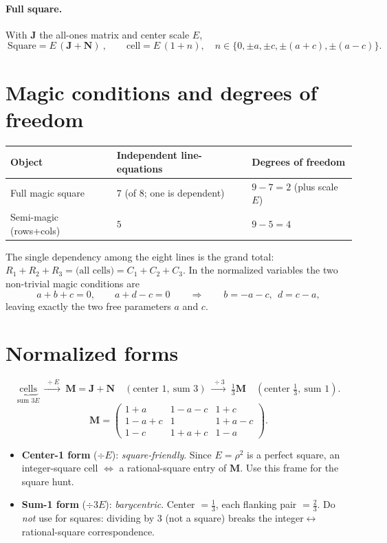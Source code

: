 \documentclass[11pt]{article}
\newcommand{\N}{\mathbf{N}}
\newcommand{\M}{\mathbf{M}}
\newcommand{\JJ}{\mathbf{J}}
\begin{document}
\paragraph{Full square.} With $\JJ$ the all-ones matrix and center scale $E$,
\[
\boxed{\ \text{Square}=E\,(\JJ+\N)\ },\qquad
\text{cell}=E\,(1+n),\quad n\in\{0,\pm a,\pm c,\pm(a+c),\pm(a-c)\}.
\]

\section{Magic conditions and degrees of freedom}

\begin{center}
\begin{tabular}{lll}
\hline
Object & Independent line-equations & Degrees of freedom\\
\hline
Full magic square & $7$ (of $8$; one is dependent) & $9-7=2$ (plus scale $E$)\\
Semi-magic (rows+cols) & $5$ & $9-5=4$\\
\hline
\end{tabular}
\end{center}

The single dependency among the eight lines is the grand total:
$R_1+R_2+R_3=\text{(all cells)}=C_1+C_2+C_3$. In the normalized variables the two
non-trivial magic conditions are
\[
a+b+c=0,\qquad a+d-c=0
\qquad\Longrightarrow\qquad b=-a-c,\ \ d=c-a,
\]
leaving exactly the two free parameters $a$ and $c$.

\section{Normalized forms}

\[
\underbrace{\text{cells}}_{\text{sum }3E}
\ \xrightarrow{\ \div E\ }\
\M=\JJ+\N \quad(\text{center }1,\ \text{sum }3)
\ \xrightarrow{\ \div 3\ }\
\tfrac13\M \quad(\text{center }\tfrac13,\ \text{sum }1).
\]
\[
\M=\begin{pmatrix}
1+a & 1-a-c & 1+c\\
1-a+c & 1 & 1+a-c\\
1-c & 1+a+c & 1-a
\end{pmatrix}.
\]
\begin{itemize}[nosep]
\item \textbf{Center-1 form} ($\div E$): \emph{square-friendly}. Since $E=\rho^2$
is a perfect square, an integer-square cell $\Leftrightarrow$ a rational-square
entry of $\M$. Use this frame for the square hunt.
\item \textbf{Sum-1 form} ($\div 3E$): \emph{barycentric}. Center $=\tfrac13$,
each flanking pair $=\tfrac23$. Do \emph{not} use for squares: dividing by $3$
(not a square) breaks the integer$\leftrightarrow$rational-square correspondence.
\end{itemize}
\end{document}

